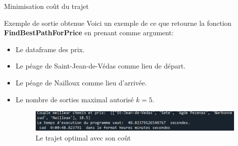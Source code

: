 \documentclass{beamer}
\begin{document}
	\begin{frame}{Minimisation coût du trajet}
		\begin{block}{Exemple de sortie obtenue}
			Voici un exemple de ce que retourne la fonction \textbf{FindBestPathForPrice} en prenant comme argument:
			\begin{itemize}
				\item Le dataframe des prix.
				\item Le péage de Saint-Jean-de-Védas comme lieu de départ.
				\item Le péage de Nailloux comme lieu d'arrivée.
				\item Le nombre de sorties maximal autorisé $k = 5$.
				
				\begin{figure}
					\begin{center}
						\includegraphics[scale=0.5]{output_exemple.png}
						\caption{Le trajet optimal avec son coût}
					\end{center}
				\end{figure}
			\end{itemize}
		\end{block}
	\end{frame}
\end{document}
